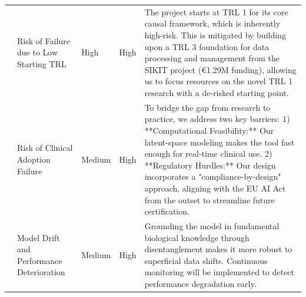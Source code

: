 \documentclass[11pt, a4paper]{article}
\begin{document}
\begin{longtable}{p{} p{} p{} p{} p{}}
    \addlinespace
    6 & Risk of Failure due to Low Starting TRL & High & High & The project starts at TRL 1 for its core causal framework, which is inherently high-risk. This is mitigated by building upon a TRL 3 foundation for data processing and management from the SIKIT project (€1.29M funding), allowing us to focus resources on the novel TRL 1 research with a de-risked starting point. \\
    \addlinespace
    7 & Risk of Clinical Adoption Failure & Medium & High & To bridge the gap from research to practice, we address two key barriers: 1) **Computational Feasibility:** Our latent-space modeling makes the tool fast enough for real-time clinical use. 2) **Regulatory Hurdles:** Our design incorporates a "compliance-by-design" approach, aligning with the EU AI Act from the outset to streamline future certification. \\
    \addlinespace
    8 & Model Drift and Performance Deterioration & Medium & High & Grounding the model in fundamental biological knowledge through disentanglement makes it more robust to superficial data shifts. Continuous monitoring will be implemented to detect performance degradation early. \\
\end{longtable}
\end{document}
